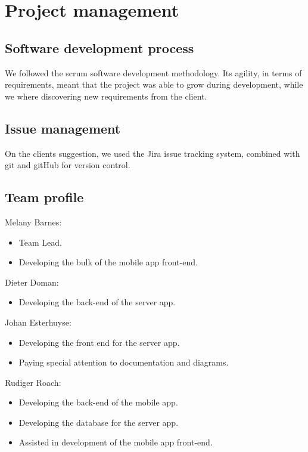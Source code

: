 \documentclass[10pt,a4paper]{article}
\begin{document}
\section{Project management}
\subsection{Software development process}
We followed the scrum software development methodology. Its agility, in terms of requirements, meant that the project was able to grow during development, while we where discovering new requirements from the client.
\subsection{Issue management}
On the clients suggestion, we used the Jira issue tracking system, combined with git and gitHub for version control.
\pagebreak
\subsection{Team profile}
Melany Barnes:
\begin{itemize}
\item Team Lead.
\item Developing the bulk of the mobile app front-end.
\end{itemize}
Dieter Doman:
\begin{itemize}
\item Developing the back-end of the server app.
\end{itemize}
Johan Esterhuyse:
\begin{itemize}
\item Developing the front end for the server app.
\item Paying special attention to documentation and diagrams.
\end{itemize}
Rudiger Roach:
\begin{itemize}
\item Developing the back-end of the mobile app.
\item Developing the database for the server app.
\item Assisted in development of the mobile app front-end.
\end{itemize}
\end{document}
